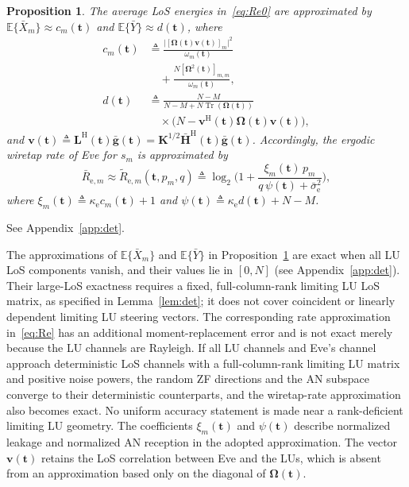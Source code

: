 \documentclass[journal]{IEEEtran}
\newtheorem{proposition}{Proposition}
\newcommand{\E}{\mathbb{E}}
\newcommand{\tr}{\operatorname{Tr}}
\newcommand{\bt}{\mathbf{t}}
\newcommand{\gb}{\bar{\mathbf{g}}}
\newcommand{\Hb}{\bar{\mathbf{H}}}
\newcommand{\bK}{\mathbf{K}}
\newcommand{\bL}{\mathbf{L}}
\newcommand{\bv}{\mathbf{v}}
\newcommand{\bOm}{\boldsymbol{\Omega}}
\newcommand{\sbe}{\bar{\sigma}_{\mathrm{e}}^2}
\begin{document}
\begin{proposition}\label{prop:eve}
The average LoS energies in~\eqref{eq:Re0} are approximated by $\E\{\bar X_m\}\approx c_m(\bt)$ and $\E\{\bar Y\}\approx d(\bt)$, where
\begin{align}
c_m(\bt)&\triangleq
 \frac{\big|[\bOm(\bt)\bv(\bt)]_m\big|^2}
 {\omega_m(\bt)}\nonumber\\
&\quad+\frac{N[\bOm^2(\bt)]_{m,m}}{\omega_m(\bt)},
\label{eq:cm}\\
d(\bt)&\triangleq\frac{N-M}
 {N-M+N\tr(\bOm(\bt))}\nonumber\\
&\quad\times\big(N-\bv^{\mathrm{H}}(\bt)\bOm(\bt)\bv(\bt)\big),
\label{eq:d}
\end{align}
and $\bv(\bt)\triangleq\bL^{\mathrm{H}}(\bt)\gb(\bt)=\bK^{1/2}\Hb^{\mathrm{H}}(\bt)\gb(\bt)$. Accordingly, the ergodic wiretap rate of Eve for $s_m$ is approximated by
\begin{equation}\label{eq:Re}
\bar R_{\mathrm{e},m}\approx\tilde R_{\mathrm{e},m}(\bt,p_m,q)\triangleq\log_2\bigg(1+\frac{\xi_m(\bt)\,p_m}{q\,\psi(\bt)+\sbe}\bigg),
\end{equation}
where $\xi_m(\bt)\triangleq\kappa_{\mathrm{e}}c_m(\bt)+1$ and $\psi(\bt)\triangleq\kappa_{\mathrm{e}}d(\bt)+N-M$.
\end{proposition}
\begin{IEEEproof}
See Appendix~\ref{app:det}.
\end{IEEEproof}

The approximations of $\E\{\bar X_m\}$ and $\E\{\bar Y\}$ in Proposition~\ref{prop:eve} are exact when all LU LoS components vanish, and their values lie in $[0,N]$ (see Appendix~\ref{app:det}). Their large-LoS exactness requires a fixed, full-column-rank limiting LU LoS matrix, as specified in Lemma~\ref{lem:det}; it does not cover coincident or linearly dependent limiting LU steering vectors. The corresponding rate approximation in~\eqref{eq:Re} has an additional moment-replacement error and is not exact merely because the LU channels are Rayleigh. If all LU channels and Eve's channel approach deterministic LoS channels with a full-column-rank limiting LU matrix and positive noise powers, the random ZF directions and the AN subspace converge to their deterministic counterparts, and the wiretap-rate approximation also becomes exact. No uniform accuracy statement is made near a rank-deficient limiting LU geometry. The coefficients $\xi_m(\bt)$ and $\psi(\bt)$ describe normalized leakage and normalized AN reception in the adopted approximation. The vector $\bv(\bt)$ retains the LoS correlation between Eve and the LUs, which is absent from an approximation based only on the diagonal of $\bOm(\bt)$.
\end{document}
